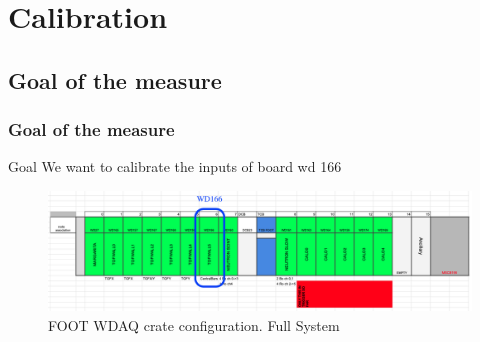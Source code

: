 \section{Calibration}
\subsection{Goal of the measure}
\begin{frame} [fragile]
\small
	\frametitle{Goal of the measure}
	\begin{block}{Goal}
		We want to calibrate the inputs of board wd 166
		 
	\end{block}
	
    	\begin{figure}
	\centering
		\includegraphics[scale=0.3]{figures/crate_configuration/wd166.png}
		
		\caption{FOOT WDAQ crate configuration. Full System}
	\end{figure}  
	
\end{frame}